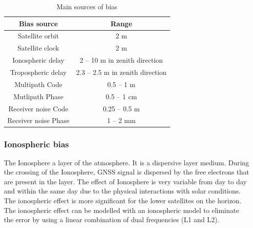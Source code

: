 			
			
			

\begin{table}[H]
	\centering
		\begin{tabular}{|c|c|} \hline
			
			
			\textbf{Bias source} & \textbf{Range}\\
			\hline
			Satellite orbit & 2 m  \\
			\hline
			Satellite clock & 2 m  \\
			\hline
			Ionospheric delay & 2 – 10 m in zenith direction \\
			\hline
			Tropospheric delay & 2.3 – 2.5 m in zenith direction \\
			\hline
			Multipath Code& 0.5 – 1 m \\
			\hline
			Mutlipath Phase& 0.5 – 1 cm\\
			\hline
			Receiver noise Code&  0.25 – 0.5 m \\
			\hline
			Receiver noise Phase& 1 – 2 mm\\
			\hline
		\end{tabular}
		\caption{Main sources of bias}
\end{table}
\subsubsection{Ionospheric bias}
The Ionosphere a layer of the atmosphere. It is a dispersive layer medium. During the crossing of the Ionosphere, GNSS signal is dispersed by the free electrons that are present in the layer.
The effect of Ionosphere is very variable from day to day and within the same day due to the physical interactions with solar conditions. The ionospheric effect is more significant for the lower satellites on the horizon. The ionospheric effect can be modelled with an ionospheric model to eliminate the error by using a linear combination of dual frequencies (L1 and L2).

